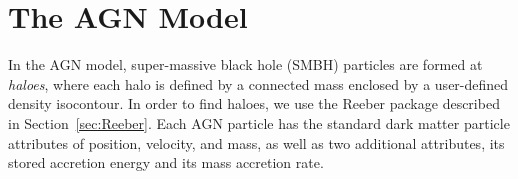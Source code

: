 \section{The AGN Model}


\newcommand{\Msun}{M_\odot}

In the AGN model, super-massive black hole (SMBH) particles are formed
at {\em haloes}, where
each halo is defined by a connected mass enclosed by a
user-defined density isocontour.
In order to find haloes,
we use the Reeber package described in Section~\ref{sec:Reeber}.
Each AGN particle has the standard dark matter particle attributes of
position, velocity, and mass, as well as two additional attributes,
its stored accretion energy and its mass accretion rate.

